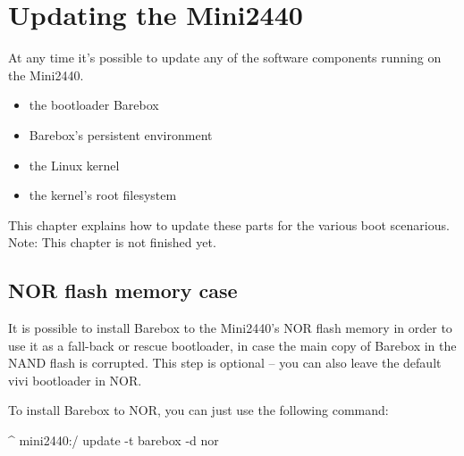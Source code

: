 %
%
%
%
%
%
%

\chapter{Updating the Mini2440}	\label{sec:updating}

At any time it's possible to update any of the software components
running on the Mini2440.

\begin{itemize}
	\item the bootloader Barebox
	\item Barebox's persistent environment
	\item the Linux kernel
	\item the kernel's root filesystem
\end{itemize}

This chapter explains how to update these parts for the various boot scenarious.
Note: This chapter is not finished yet.

\section{NOR flash memory case}

It is possible to install Barebox to the Mini2440's NOR flash memory in order to
use it as a fall-back or rescue bootloader, in case the main copy of Barebox in
the NAND flash is corrupted. This step is optional -- you can also leave the
default vivi bootloader in NOR.

To install Barebox to NOR, you can just use the following command:

\begin{ptxshell}[escapechar=|]{^}
mini2440:/ update -t barebox -d nor
\end{ptxshell}

